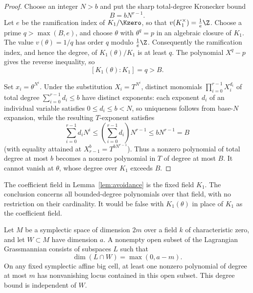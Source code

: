 \begin{proof}
Choose an integer $N>b$ and put the sharp total-degree Kronecker bound
\[
 B=b N^{r-1}.
\]
Let $e$ be the ramification index of $K_1/\Kzero$, so that
$v(K_1^\times)=\frac1e\Z$.  Choose a prime $q>\max(B,e)$, and choose
$\theta$ with $\theta^q=p$ in an algebraic closure of $K_1$.  The value
$v(\theta)=1/q$ has order $q$ modulo $\frac1e\Z$.  Consequently the
ramification index, and hence the degree, of $K_1(\theta)/K_1$ is at
least $q$.  The polynomial $X^q-p$ gives the reverse inequality, so
\[
 [K_1(\theta):K_1]=q>B.
\]

Set $x_i=\theta^{N^i}$.  Under the substitution $X_i=T^{N^i}$,
distinct monomials $\prod_{i=0}^{r-1}X_i^{d_i}$ of total degree
$\sum_{i=0}^{r-1}d_i\leq b$ have distinct exponents:
each exponent $d_i$ of an individual variable satisfies $0\leq d_i\leq b<N$,
so uniqueness follows from base-$N$ expansion, while the resulting
$T$-exponent satisfies
\[
 \sum_{i=0}^{r-1}d_i N^i
 \leq\left(\sum_{i=0}^{r-1}d_i\right)N^{r-1}
 \leq b N^{r-1}=B
\]
(with equality attained at $X_{r-1}^b=T^{b N^{r-1}}$).  Thus a nonzero
polynomial of total degree at most $b$ becomes a nonzero polynomial in
$T$ of degree at most $B$.  It cannot vanish at $\theta$, whose degree
over $K_1$ exceeds $B$.
\end{proof}

\begin{remark}
The coefficient field in Lemma~\ref{lem:avoidance} is the fixed field
$K_1$.  The conclusion concerns all bounded-degree polynomials over that
field, with no restriction on their cardinality.  It would be false with
$K_1(\theta)$ in place of $K_1$ as the coefficient field.
\end{remark}

\begin{lemma}
\label{lem:lagrangian-intersection}
Let $M$ be a symplectic space of dimension $2m$ over a field $k$ of
characteristic zero, and let $W\subset M$ have dimension $a$.  A nonempty
open subset of the Lagrangian Grassmannian consists of subspaces $L$
such that
\[
 \dim(L\cap W)=\max(0,a-m).
\]
On any fixed symplectic affine big cell, at least one nonzero polynomial
of degree at most $m$ has nonvanishing locus contained in this open
subset.  This degree bound is independent of $W$.
\end{lemma}

